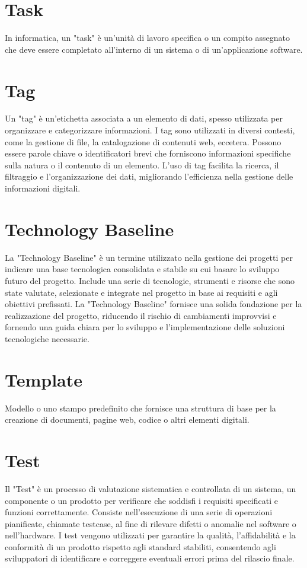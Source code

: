 \documentclass{article}
\begin{document}
\section{Task}
In informatica, un "task" è un'unità di lavoro specifica o un compito assegnato che deve essere completato all'interno di un sistema o di un'applicazione software.

\section{Tag}
Un "tag" è un'etichetta associata a un elemento di dati, spesso utilizzata per organizzare e categorizzare informazioni. I tag sono utilizzati in diversi contesti, come la gestione di file, la catalogazione di contenuti web, eccetera. Possono essere parole chiave o identificatori brevi che forniscono informazioni specifiche sulla natura o il contenuto di un elemento. L'uso di tag facilita la ricerca, il filtraggio e l'organizzazione dei dati, migliorando l'efficienza nella gestione delle informazioni digitali.

\section{Technology Baseline}
La "Technology Baseline" è un termine utilizzato nella gestione dei progetti per indicare una base tecnologica consolidata e stabile su cui basare lo sviluppo futuro del progetto. Include una serie di tecnologie, strumenti e risorse che sono state valutate, selezionate e integrate nel progetto in base ai requisiti e agli obiettivi prefissati. La "Technology Baseline" fornisce una solida fondazione per la realizzazione del progetto, riducendo il rischio di cambiamenti improvvisi e fornendo una guida chiara per lo sviluppo e l'implementazione delle soluzioni tecnologiche necessarie.

\section{Template}
Modello o uno stampo predefinito che fornisce una struttura di base per la creazione di documenti, pagine web, codice o altri elementi digitali.

\section{Test}
Il "Test" è un processo di valutazione sistematica e controllata di un sistema, un componente o un prodotto per verificare che soddisfi i requisiti specificati e funzioni correttamente. Consiste nell'esecuzione di una serie di operazioni pianificate, chiamate testcase, al fine di rilevare difetti o anomalie nel software o nell'hardware. I test vengono utilizzati per garantire la qualità, l'affidabilità e la conformità di un prodotto rispetto agli standard stabiliti, consentendo agli sviluppatori di identificare e correggere eventuali errori prima del rilascio finale.
\end{document}

